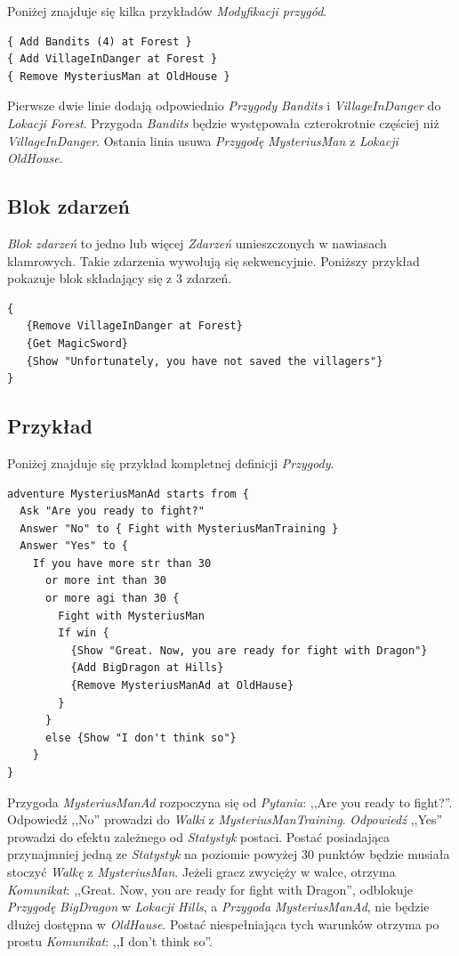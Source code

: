 \documentclass[openright]{xmgr}
\begin{document}
Poniżej znajduje się kilka przykładów \textit{Modyfikacji przygód}. 
\begin{verbatim}
{ Add Bandits (4) at Forest }
{ Add VillageInDanger at Forest }
{ Remove MysteriusMan at OldHouse }
\end{verbatim}
Pierwsze dwie linie dodają odpowiednio \textit{Przygody} \textit{Bandits} i \textit{VillageInDanger} do \textit{Lokacji} \textit{Forest}. Przygoda \textit{Bandits} będzie występowała czterokrotnie częściej niż \textit{VillageInDanger}. Ostania linia usuwa \textit{Przygodę} \textit{MysteriusMan} z \textit{Lokacji} \textit{OldHouse}.

\subsection*{Blok zdarzeń}
\textit{Blok zdarzeń} to jedno lub więcej \textit{Zdarzeń} umieszczonych w nawiasach klamrowych. Takie zdarzenia wywołują się sekwencyjnie.
Poniższy przykład pokazuje blok składający się z 3 zdarzeń.
\begin{verbatim}
{
   {Remove VillageInDanger at Forest}
   {Get MagicSword}
   {Show "Unfortunately, you have not saved the villagers"}
}
\end{verbatim}

\subsection*{Przykład}
Poniżej znajduje się przykład kompletnej definicji \textit{Przygody}.
\begin{verbatim}
adventure MysteriusManAd starts from {
  Ask "Are you ready to fight?"
  Answer "No" to { Fight with MysteriusManTraining }
  Answer "Yes" to {
    If you have more str than 30 
      or more int than 30 
      or more agi than 30 {
        Fight with MysteriusMan
        If win {
          {Show "Great. Now, you are ready for fight with Dragon"}
          {Add BigDragon at Hills}
          {Remove MysteriusManAd at OldHause}
        }
      }
      else {Show "I don't think so"}
    }
}
\end{verbatim}
Przygoda \textit{MysteriusManAd} rozpoczyna się od \textit{Pytania}: ,,Are you ready to fight?''. Odpowiedź ,,No'' prowadzi do \textit{Walki} z \textit{MysteriusManTraining}.
\textit{Odpowiedź} ,,Yes'' prowadzi do efektu zależnego od \textit{Statystyk} postaci. Postać posiadająca przynajmniej jedną ze \textit{Statystyk} na poziomie powyżej 30 punktów będzie musiała stoczyć \textit{Walkę} z \textit{MysteriusMan}. Jeżeli gracz zwycięży w walce, otrzyma \textit{Komunikat}: ,,Great. Now, you are ready for fight with Dragon'', odblokuje \textit{Przygodę} \textit{BigDragon} w \textit{Lokacji} \textit{Hills}, a \textit{Przygoda} \textit{MysteriusManAd}, nie będzie dłużej dostępna w \textit{OldHause}. Postać niespełniająca tych warunków otrzyma po prostu \textit{Komunikat}: ,,I don't think so''. 
\end{document}
